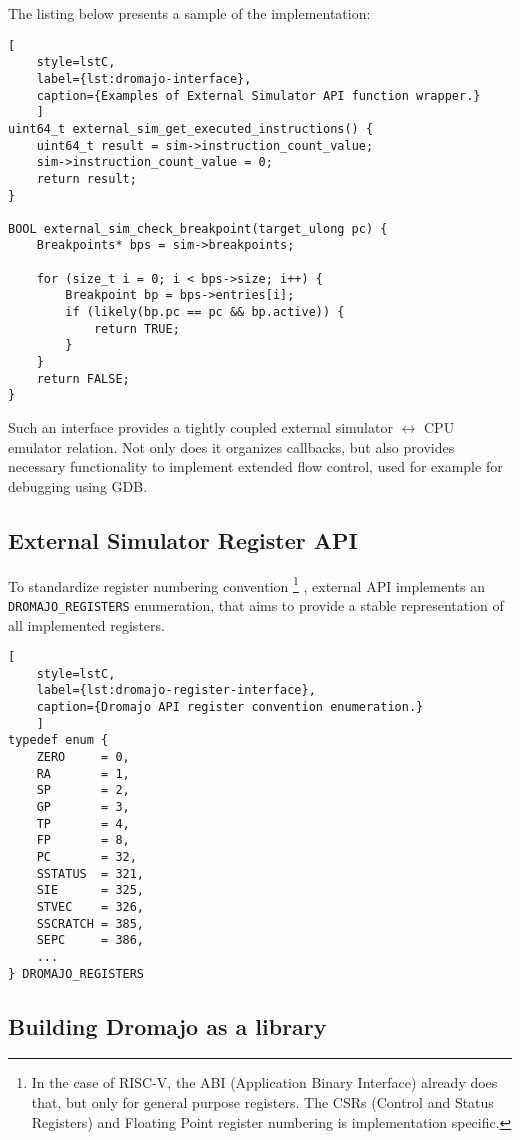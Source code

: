 \noindent
The listing below presents a sample of the implementation:

\begin{lstlisting}[
    style=lstC,
    label={lst:dromajo-interface},
    caption={Examples of External Simulator API function wrapper.}
    ]
uint64_t external_sim_get_executed_instructions() {
    uint64_t result = sim->instruction_count_value;
    sim->instruction_count_value = 0;
    return result;
}

BOOL external_sim_check_breakpoint(target_ulong pc) {
    Breakpoints* bps = sim->breakpoints;

    for (size_t i = 0; i < bps->size; i++) {
        Breakpoint bp = bps->entries[i];
        if (likely(bp.pc == pc && bp.active)) {
            return TRUE;
        }
    }
    return FALSE;
}
\end{lstlisting}

\noindent
Such an interface provides a tightly coupled external simulator $\leftrightarrow$ CPU emulator relation. Not only does
it organizes callbacks, but also provides necessary functionality to implement extended flow control, used for example
for debugging using GDB.

\pagebreak

\subsection{External Simulator Register API}

To standardize register numbering convention%
\footnote{In the case of RISC-V, the ABI (Application Binary Interface)
already does that, but only for general purpose registers. The CSRs (Control and Status Registers) and Floating Point
register numbering is implementation specific.}%
, external API implements an \texttt{DROMAJO\_REGISTERS} enumeration, that aims to provide a stable representation of
all implemented registers.

\begin{lstlisting}[
    style=lstC,
    label={lst:dromajo-register-interface},
    caption={Dromajo API register convention enumeration.}
    ]
typedef enum {
    ZERO     = 0,
    RA       = 1,
    SP       = 2,
    GP       = 3,
    TP       = 4,
    FP       = 8,
    PC       = 32,
    SSTATUS  = 321,
    SIE      = 325,
    STVEC    = 326,
    SSCRATCH = 385,
    SEPC     = 386,
    ...
} DROMAJO_REGISTERS
\end{lstlisting}

\subsection{Building Dromajo as a library}

